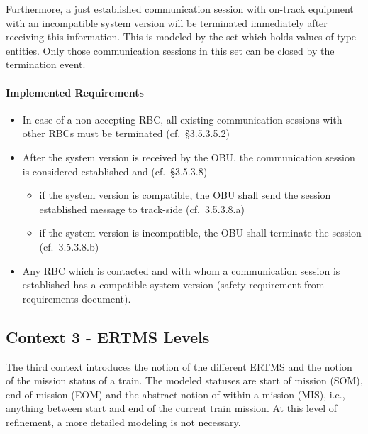 \documentclass{template/openetcs_article}
\begin{document}
Furthermore, a just established communication session with on-track equipment
with an incompatible system version will be terminated immediately after
receiving this information. This is modeled by the set
 which holds values of type entities. Only those
communication sessions in this set can be closed by the termination event.

\paragraph{Implemented Requirements}
\label{sec:impl-requ-2}

\begin{itemize}
\item In case of a non-accepting RBC, all existing communication sessions with
  other RBCs must be terminated (cf.~§3.5.3.5.2)
\item After the system version  is received by the OBU, the communication
  session is considered established and (cf.~§3.5.3.8)
  \begin{itemize}
  \item if the system version is compatible, the OBU shall send the session
    established message to track-side (cf.~3.5.3.8.a)
  \item if the system version is incompatible, the OBU shall terminate the
    session (cf.~3.5.3.8.b)
  \end{itemize}
\item Any RBC which is contacted and with whom a communication session is
  established has a compatible system version (safety requirement from
  requirements document).
\end{itemize}



\subsection{Context 3 - ERTMS Levels}
\label{sec:context-3-ertms}

The third context introduces the notion of the different ERTMS and the notion of
the mission status of a train. The modeled statuses are start of mission (SOM),
end of mission (EOM) and the abstract notion of within a mission (MIS), i.e.,
anything between start and end of the current train mission. At this level of
refinement, a more detailed modeling is not necessary.


\end{document}
